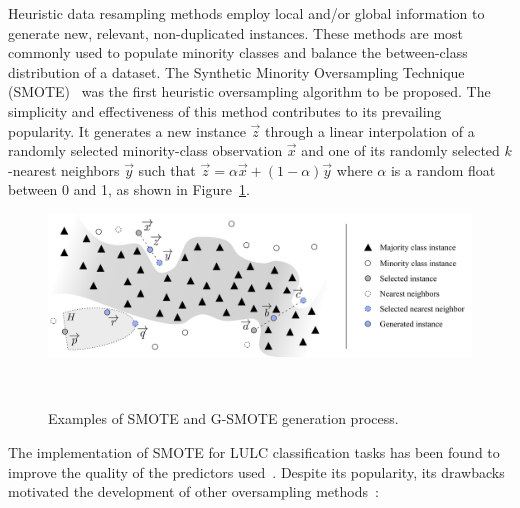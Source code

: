 \documentclass[parskip=full]{scrartcl}
\begin{document}
Heuristic data resampling methods employ local and/or global information to generate new, relevant,
non-duplicated instances. These methods are most commonly used to populate minority classes and
balance the between-class distribution of a dataset. The Synthetic Minority Oversampling Technique
(SMOTE)~\cite{Chawla2002} was the first heuristic oversampling algorithm to be proposed. The
simplicity and effectiveness of this method contributes to its prevailing popularity. It generates a
new instance $\overrightarrow{z}$ through a linear interpolation of a randomly selected
minority-class observation $\overrightarrow{x}$ and one of its randomly selected $k$-nearest
neighbors $\overrightarrow{y}$ such that $\overrightarrow{z} = \alpha\overrightarrow{x} +
(1-\alpha)\overrightarrow{y}$ where $\alpha$ is a random float between 0 and 1, as shown in
Figure~\ref{fig:data_generation}. 

\begin{figure}[H]
	\centering
	\includegraphics[width=\linewidth]{../analysis/data_generation}
	\caption{Examples of SMOTE and G-SMOTE generation process.
    }~\label{fig:data_generation}
\end{figure}

The implementation of SMOTE for LULC classification tasks has been found to improve the quality of
the predictors used~\cite{Jozdani2019,Bogner2018}. Despite its popularity, its drawbacks motivated
the development of other oversampling methods~\cite{Douzas2019}:
\end{document}
